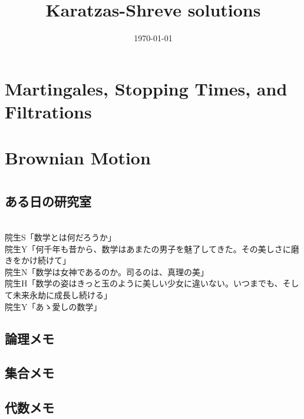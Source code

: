 \documentclass[a4j,10.5pt,oneside,openany]{jsbook}
\title{Karatzas-Shreve solutions}
\author{}
\date{\today}
\theoremstyle{mystyle}
\begin{document}
%
%

\maketitle
%
%
\tableofcontents
\frontmatter
%
\mainmatter
%
\chapter{Martingales, Stopping Times, and Filtrations}








\chapter{Brownian Motion}






\appendix
\chapter{}
\section{ある日の研究室}\mbox{}\\
	院生S「数学とは何だろうか」\\
	院生Y「何千年も昔から、数学はあまたの男子を魅了してきた。その美しさに磨きをかけ続けて」\\
	院生N「数学は女神であるのか。司るのは、真理の美」\\
	院生H「数学の姿はきっと玉のように美しい少女に違いない。いつまでも、そして未来永劫に成長し続ける」\\
	院生Y「あゝ愛しの数学」
\section{論理メモ}
	
\section{集合メモ}
	
	
	
	
\section{代数メモ}
	
\end{document}
